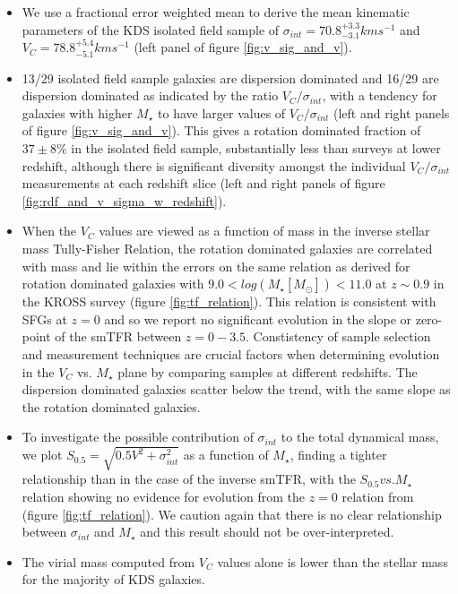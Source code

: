 \documentclass[fleqn,usenatbib]{mn2e}
\begin{document}
\begin{itemize}
    \item We use a fractional error weighted mean to derive the mean kinematic parameters of the KDS isolated field sample of $\sigma_{int} = 70.8^{+3.3}_{-3.1} kms^{-1}$ and $V_{C} = 78.8^{+5.4}_{-5.1}kms^{-1}$ (left panel of figure \ref{fig:v_sig_and_v}).
    \item 13/29 isolated field sample galaxies are dispersion dominated and 16/29 are dispersion dominated as indicated by the ratio $V_{C}/\sigma_{int}$, with a tendency for galaxies with higher $M_{\star}$ to have larger values of $V_{C}/\sigma_{int}$ (left and right panels of figure \ref{fig:v_sig_and_v}).
    This gives a rotation dominated fraction of $37 \pm 8 \%$ in the isolated field sample, substantially less than surveys at lower redshift, although there is significant diversity amongst the individual $V_{C}/\sigma_{int}$ measurements at each redshift slice (left and right panels of figure \ref{fig:rdf_and_v_sigma_w_redshift}).
    \item When the $V_{C}$ values are viewed as a function of mass in the inverse stellar mass Tully-Fisher Relation, the rotation dominated galaxies are correlated with mass and lie within the errors on the same relation as derived for rotation dominated galaxies with $9.0 < log(M_{\star}[M_{\odot}]) < 11.0$ at $z\sim0.9$ in the KROSS survey (figure \ref{fig:tf_relation}). %
    This relation is consistent with SFGs at $z=0$ and so we report no significant evolution in the slope or zero-point of the smTFR between $z=0-3.5$.
    Constistency of sample selection and measurement techniques are crucial factors when determining evolution in the $V_{C}$ vs. $M_{\star}$ plane by comparing samples at different redshifts.
    The dispersion dominated galaxies scatter below the trend, with the same slope as the rotation dominated galaxies.
    \item To investigate the possible contribution of $\sigma_{int}$ to the total dynamical mass, we plot $S_{0.5} = \sqrt{0.5V^{2} + \sigma_{int}^{2}}$ as a function of $M_{\star}$, finding a tighter relationship than in the case of the inverse smTFR, with the $S_{0.5} vs. M_{\star}$ relation showing no evidence for evolution from the $z=0$ relation from \cite{Kassin2007} (figure \ref{fig:tf_relation}).
    We caution again that there is no clear relationship between $\sigma_{int}$ and $M_{\star}$ and this result should not be over-interpreted.
    \item The virial mass computed from $V_{C}$ values alone is lower than the stellar mass for the majority of KDS galaxies.

\end{itemize}
\end{document}
